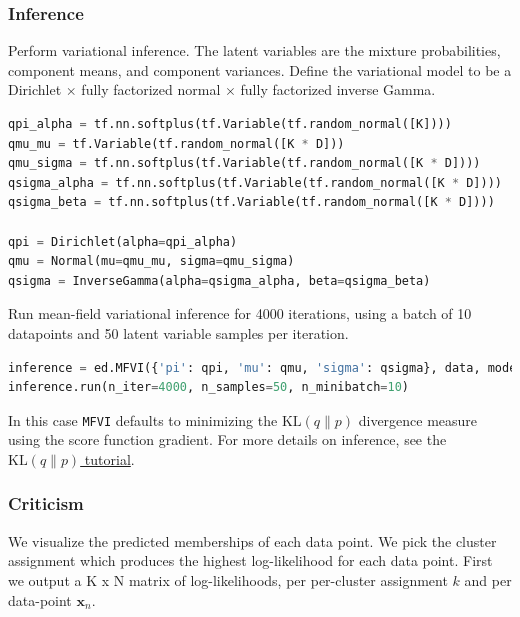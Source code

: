 \subsubsection{Inference}
Perform variational inference.
%
The latent variables are the mixture probabilities,
component means, and component variances.
Define the variational model to be a Dirichlet $\times$ fully factorized normal
$\times$ fully factorized inverse Gamma.
%
\begin{lstlisting}[language=Python]
qpi_alpha = tf.nn.softplus(tf.Variable(tf.random_normal([K])))
qmu_mu = tf.Variable(tf.random_normal([K * D]))
qmu_sigma = tf.nn.softplus(tf.Variable(tf.random_normal([K * D])))
qsigma_alpha = tf.nn.softplus(tf.Variable(tf.random_normal([K * D])))
qsigma_beta = tf.nn.softplus(tf.Variable(tf.random_normal([K * D])))

qpi = Dirichlet(alpha=qpi_alpha)
qmu = Normal(mu=qmu_mu, sigma=qmu_sigma)
qsigma = InverseGamma(alpha=qsigma_alpha, beta=qsigma_beta)
\end{lstlisting}

Run mean-field variational inference for 4000 iterations, using a batch
of 10 datapoints and 50 latent variable samples per iteration.
\begin{lstlisting}[language=Python]
inference = ed.MFVI({'pi': qpi, 'mu': qmu, 'sigma': qsigma}, data, model)
inference.run(n_iter=4000, n_samples=50, n_minibatch=10)
\end{lstlisting}
In this case
\texttt{MFVI} defaults to minimizing the
$\text{KL}(q\|p)$ divergence measure using the score function
gradient.
For more details on inference, see the \href{tut_KLqp}{$\text{KL}(q\|p)$ tutorial}.


\subsubsection{Criticism}

We visualize the predicted memberships of each data point.
We pick the cluster assignment which produces
the highest log-likelihood for each data point.
First we output a K x N matrix of log-likelihoods, per
per-cluster assignment $k$ and per data-point $\mathbf{x}_n$.

